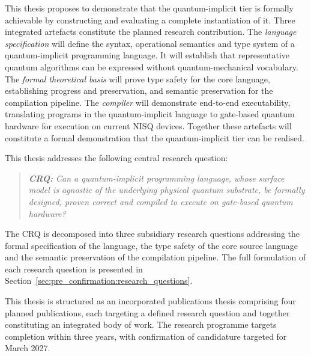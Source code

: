 This thesis proposes to demonstrate that the quantum-implicit tier is formally achievable by constructing and evaluating a complete instantiation of it.
Three integrated artefacts constitute the planned research contribution.
The \textit{language specification} will define the syntax, operational semantics and type system of a quantum-implicit programming language.
It will establish that representative quantum algorithms can be expressed without quantum-mechanical vocabulary.
The \textit{formal theoretical basis} will prove type safety for the core language, establishing progress and preservation, and semantic preservation for the compilation pipeline.
The \textit{compiler} will demonstrate end-to-end executability, translating programs in the quantum-implicit language to gate-based quantum hardware for execution on current NISQ devices.
Together these artefacts will constitute a formal demonstration that the quantum-implicit tier can be realised.

This thesis addresses the following central research question:

\begin{quote}
    \textit{\textbf{CRQ: }Can a quantum-implicit programming language, whose surface model is agnostic of the underlying physical quantum substrate, be formally designed, proven correct and compiled to execute on gate-based quantum hardware?}
\end{quote}

The CRQ is decomposed into three subsidiary research questions addressing the formal specification of the language, the type safety of the core source language and the semantic preservation of the compilation pipeline.
The full formulation of each research question is presented in Section~\ref{sec:pre_confirmation:research_questions}.

This thesis is structured as an incorporated publications thesis comprising four planned publications, each targeting a defined research question and together constituting an integrated body of work.
The research programme targets completion within three years, with confirmation of candidature targeted for March 2027.